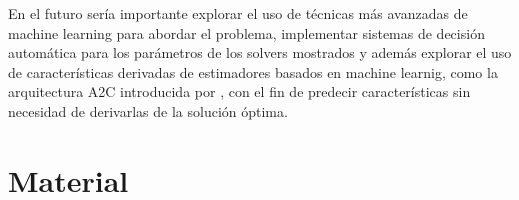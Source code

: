 \documentclass[spanish, a4paper, 12pt, openany,final]{book}
\begin{document}
En el futuro sería importante explorar el uso de técnicas más avanzadas de machine learning para abordar el problema, implementar sistemas de decisión automática para los parámetros de los solvers mostrados y además explorar el uso de características derivadas de estimadores basados en machine learnig, como la arquitectura A2C introducida por \cite{mnih_asynchronous_2016}, con el fin de predecir características sin necesidad de derivarlas de la solución óptima.




    
    
\clearpage

\newpage
\renewcommand\refname{Referencias}          %
{                           %
}

\newpage
\renewcommand{\appendixpagename}{Apéndices}     %

\appendix   %

\chapter{Material}
\end{document}
